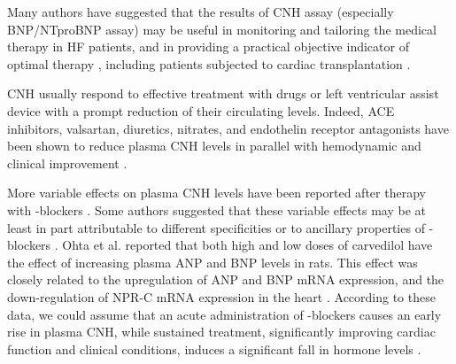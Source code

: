 \documentclass[14pt,a4paper,onecolumn]{extarticle}
\begin{document}
Many authors have suggested that the results of CNH assay (especially BNP/NTproBNP assay) may be useful in monitoring and tailoring the medical therapy in HF patients, and in providing a practical objective indicator of optimal therapy \citep{bib361} \citep{bib362} \citep{bib363} \citep{bib364} \citep{bib365} \citep{bib368} \citep{bib369} \citep{bib370} \citep{bib385} \citep{bib390} \citep{bib3168} \citep{bib3252} \citep{bib3253} \citep{bib3254} \citep{bib3255} \citep{bib3256} \citep{bib3257} \citep{bib3258} \citep{bib3259} \citep{bib3260} \citep{bib3261} \citep{bib3262} \citep{bib3263} \citep{bib3264}  \citep{bib3265}, including patients subjected to cardiac transplantation \citep{bib3266}.

CNH usually respond to effective treatment with drugs \citep{bib35} \citep{bib361} \citep{bib362} \citep{bib363} \citep{bib364} \citep{bib365} or left ventricular assist device \citep{bib3267} \citep{bib3268} with a prompt reduction of their circulating levels. Indeed, ACE inhibitors, valsartan, diuretics, nitrates, and endothelin receptor antagonists have been shown to reduce plasma CNH levels in parallel with hemodynamic and clinical improvement \citep{bib362} \citep{bib363} \citep{bib3252} \citep{bib3258} \citep{bib3271} \citep{bib3272} \citep{bib3273} \citep{bib3274} \citep{bib3275} \citep{bib3276} \citep{bib3277}.

More variable effects on plasma CNH levels have been reported after therapy with \beta-blockers \citep{bib390} \citep{bib3278} \citep{bib3279} \citep{bib3280} \citep{bib3281} \citep{bib3282} \citep{bib3283} \citep{bib3284} \citep{bib3285} \citep{bib3286} \citep{bib3287} \citep{bib3288} \citep{bib3289} \citep{bib3290} \citep{bib3291} \citep{bib3292}. Some authors suggested that these variable effects may be at least in part attributable to different specificities or to ancillary properties of \beta-blockers \citep{bib362}. Ohta et al. \citep{bib3293} reported that both high and low doses of carvedilol have the effect of increasing plasma ANP and BNP levels in rats. This effect was closely related to the upregulation of ANP and BNP mRNA expression, and the down-regulation of NPR-C mRNA expression in the heart \citep{bib3293}. According to these data, we could assume that an acute administration of \beta-blockers causes an early rise in plasma CNH, while sustained treatment, significantly improving cardiac function and clinical conditions, induces a significant fall in hormone levels \citep{bib390} \citep{bib3284} \citep{bib3287} \citep{bib3289} \citep{bib3290}.
\end{document}
